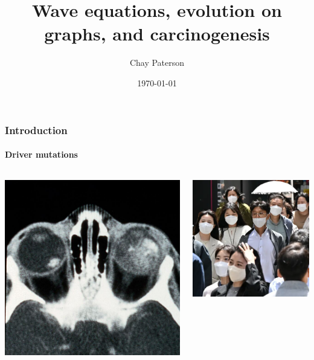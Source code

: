 \documentclass{beamer}
\title{Wave equations, evolution on graphs, and carcinogenesis}
\author{Chay Paterson}
\institute{University of Manchester}
\date{\today}
\begin{document}
\frame{\titlepage}

\begin{frame}
    \frametitle{Introduction}
    \framesubtitle{Driver mutations}

    \begin{columns}
        \begin{column}{0.5\textwidth}
        \includegraphics[width=\textwidth]{figures/tumour2.jpg}
        \end{column}
        \begin{column}{0.5\textwidth}
        \includegraphics[width=\textwidth]{figures/covid.png}

\end{column}
\end{columns}
\end{frame}
\end{document}
